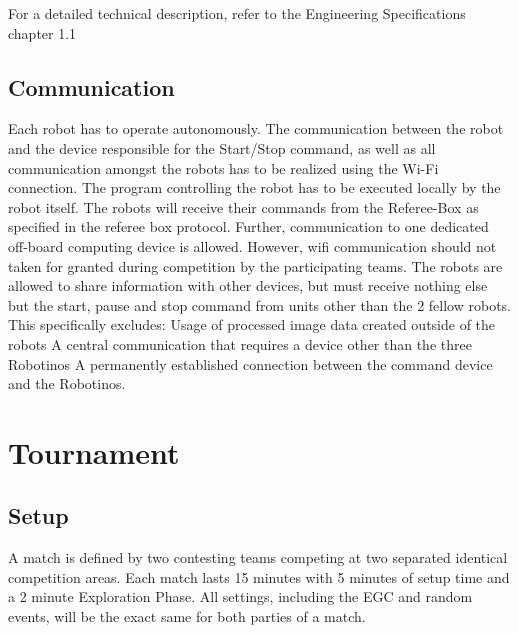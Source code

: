 \documentclass[12pt,twoside]{article}
\begin{document}
For a detailed technical description, refer to the Engineering
Specifications chapter 1.1 

\subsection{Communication}

Each robot has to operate autonomously. The communication between the
robot and the device responsible for the Start/Stop command, as well
as all communication amongst the robots has to be realized using the
Wi-Fi connection. The program controlling the robot has to be executed
locally by the robot itself. %
  The robots will receive their commands from the Referee-Box as
  specified in the referee box protocol. Further, communication to one
  dedicated off-board computing device is allowed. However, wifi
  communication should not taken for granted during competition by the
  participating teams. 
The robots are allowed to share information with other devices, but
must receive nothing else but the start, pause and stop command
from units other than the 2 fellow robots. This specifically excludes:
Usage of processed image data created outside of the robots A central
communication that requires a device other than the three Robotinos A
permanently established connection between the command device and the
Robotinos.



\section{Tournament}
\subsection{Setup}

A match is defined by two contesting teams competing at two separated
identical competition areas. Each match lasts 15 minutes with 5
minutes of setup time and a 2 minute Exploration Phase. All settings, including
the EGC and random events, will be the exact same for both parties of a match.
\end{document}
